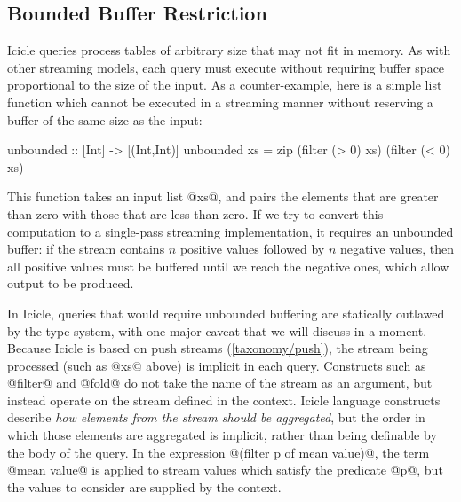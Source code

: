 \subsection{Bounded Buffer Restriction}
\label{icicle:s:IcicleSource:bounded}
Icicle queries process tables of arbitrary size that may not fit in memory.
As with other streaming models, each query must execute without requiring buffer space proportional to the size of the input.
As a counter-example, here is a simple list function which cannot be executed in a streaming manner without reserving a buffer of the same size as the input:
\begin{haskell}
unbounded :: [Int] -> [(Int,Int)]
unbounded xs = zip (filter (> 0) xs) (filter (< 0) xs)
\end{haskell}

This function takes an input list @xs@, and pairs the elements that are greater than zero with those that are less than zero.
If we try to convert this computation to a single-pass streaming implementation, it requires an unbounded buffer: if the stream contains $n$ positive values followed by $n$ negative values, then all positive values must be buffered until we reach the negative ones, which allow output to be produced.


In Icicle, queries that would require unbounded buffering are statically outlawed by the type system, with one major caveat that we will discuss in a moment.
Because Icicle is based on push streams (\cref{taxonomy/push}), the stream being processed (such as @xs@ above) is implicit in each query.
Constructs such as @filter@ and @fold@ do not take the name of the stream as an argument, but instead operate on the stream defined in the context.
Icicle language constructs describe \emph{how elements from the stream should be aggregated}, but the order in which those elements are aggregated is implicit, rather than being definable by the body of the query.
In the expression @(filter p of mean value)@, the term @mean value@ is applied to stream values which satisfy the predicate @p@, but the values to consider are supplied by the context.

